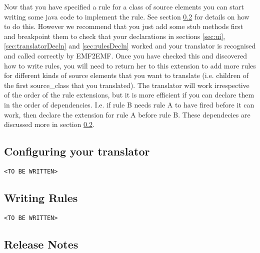 	Now that you have specified a rule for a class of source elements you can start writing some java code to implement the rule. See section \ref{sec:rulesWriting} for details on how to do this. However we recommend that you just add some stub methods first and breakpoint them to check that your declarations in sections \ref{sec:ui}, \ref{sec:translatorDecln} and \ref{sec:rulesDecln} worked and your translator is recognised and called correctly by EMF2EMF. Once you have checked this and discovered how to write rules, you will need to return her to this extension to add more rules for different kinds of source elements that you want to translate (i.e. children of the first source\_class that you translated). The translator will work irrespective of the order of the rule extensions, but it is more efficient if you can declare them in the order of dependencies. I.e. if rule B needs rule A to have fired before it can work, then declare the extension for rule A before rule B. These dependecies are discussed more in section \ref{sec:rulesWriting}. 

\subsection{Configuring your translator}
\label{sec:configure}

\texttt{<TO BE WRITTEN>}

\subsection{Writing Rules}
\label{sec:rulesWriting}

\texttt{<TO BE WRITTEN>}

\subsection{Release Notes}
\label{sec:release-notes}

